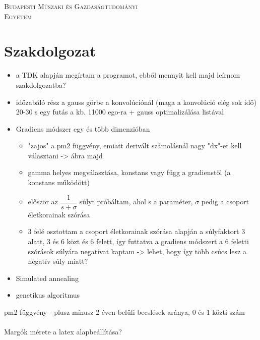 \documentclass[12pt]{article}
\title{}
\date{}
\begin{document}
\begin{titlepage}
	\centering
	{\scshape\LARGE Budapesti Műszaki és Gazdaságtudományi\\Egyetem \par}

\end{titlepage}

\onehalfspacing
\section*{Szakdolgozat}
\begin{itemize}
	\item a TDK alapján megírtam a programot, ebből mennyit kell majd leírnom szakdolgozatba?
	\item időzabáló rész a gauss görbe a konvolúciónál (maga a konvolúció elég sok idő) 20-30 s egy futás a kb. 11000 ego-ra + gauss optimalizálása listával
	\item Gradiens módszer egy és több dimenzióban
	\begin{itemize}
		\item "zajos" a pm2 függvény, emiatt derivált számolásnál nagy "dx"-et kell választani -> ábra majd
		\item gamma helyes megválasztása, konstans vagy függ a gradienstől (a konstans működött)
		\item először az $\dfrac{1}{s + \sigma}$ súlyt próbáltam, ahol s a paraméter, $\sigma$ pedig a csoport életkorainak szórása
		\item 3 felé osztottam a csoport életkorainak szórása alapján a súlyfaktort 3 alatt, 3 és 6 közt és 6 felett, így futtatva a gradiens módszert a 6 feletti szórások súlyára negatívat kaptam -> lehet, hogy így több csúcs lesz a negatív súly miatt?
	\end{itemize}
	\item Simulated annealing
	\item genetikus algoritmus
\end{itemize}
pm2 függvény - plusz mínusz 2 éven belüli becslések aránya, 0 és 1 közti szám \\ \\
Margók mérete a latex alapbeállítása?
\end{document}
